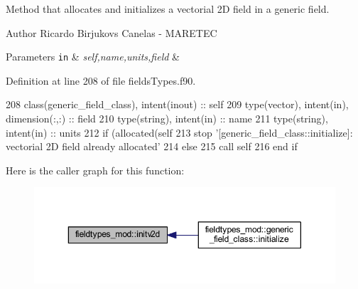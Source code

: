 Method that allocates and initializes a vectorial 2D field in a generic field. 

\begin{DoxyAuthor}{Author}
Ricardo Birjukovs Canelas -\/ M\+A\+R\+E\+T\+EC 
\end{DoxyAuthor}

\begin{DoxyParams}[1]{Parameters}
\mbox{\tt in}  & {\em self,name,units,field} & \\
\hline
\end{DoxyParams}


Definition at line 208 of file fields\+Types.\+f90.


\begin{DoxyCode}
208     \textcolor{keywordtype}{class}(generic\_field\_class), \textcolor{keywordtype}{intent(inout)} :: self
209     \textcolor{keywordtype}{type}(vector), \textcolor{keywordtype}{intent(in)}, \textcolor{keywordtype}{dimension(:,:)} :: field
210     \textcolor{keywordtype}{type}(string), \textcolor{keywordtype}{intent(in)} :: name
211     \textcolor{keywordtype}{type}(string), \textcolor{keywordtype}{intent(in)} :: units
212     \textcolor{keywordflow}{if} (\textcolor{keyword}{allocated}(self%
213         stop \textcolor{stringliteral}{'[generic\_field\_class::initialize]: vectorial 2D field already allocated'}
214     \textcolor{keywordflow}{else}
215         \textcolor{keyword}{call }self%
216 \textcolor{keywordflow}{    end if}
\end{DoxyCode}
Here is the caller graph for this function\+:\nopagebreak
\begin{figure}[H]
\begin{center}
\leavevmode
\includegraphics[width=350pt]{namespacefieldtypes__mod_ad1af664e23793260f9c2fcd03829a1f5_icgraph}
\end{center}
\end{figure}
\mbox{\label{namespacefieldtypes__mod_aa0a152c9e5131d3003cc34e4f3b2974d}} 
